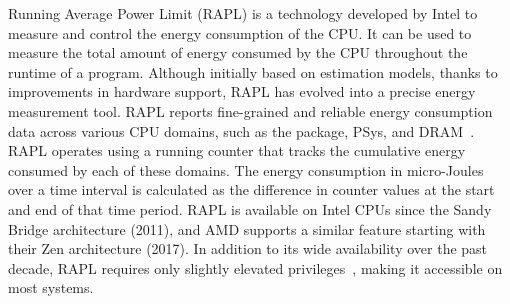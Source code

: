 Running Average Power Limit (RAPL) is a technology developed by Intel to measure and control the
energy consumption of the CPU. It can be used to measure the total amount of energy consumed by the
CPU throughout the runtime of a program. Although initially based on estimation models, thanks to
improvements in hardware support, RAPL has evolved into a precise energy measurement tool. RAPL
reports fine-grained and reliable energy consumption data across various CPU domains, such as the
package, PSys, and DRAM~\cite{rapl}. RAPL operates using a running counter that tracks the
cumulative energy consumed by each of these domains. The energy consumption in micro-Joules over a
time interval is calculated as the difference in counter values at the start and end of that time
period. RAPL is available on Intel CPUs since the Sandy Bridge architecture (2011), and AMD supports
a similar feature starting with their Zen architecture (2017). In addition to its wide availability
over the past decade, RAPL requires only slightly elevated privileges~\cite{rapl-security}, making
it accessible on most systems.
